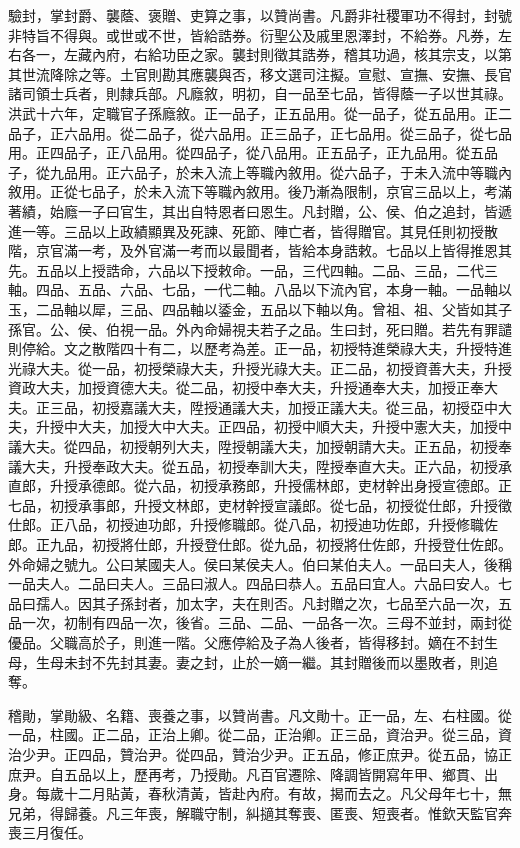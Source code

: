 驗封，掌封爵、襲蔭、褒贈、吏算之事，以贊尚書。凡爵非社稷軍功不得封，封號非特旨不得與。或世或不世，皆給誥券。衍聖公及戚里恩澤封，不給券。凡券，左右各一，左藏內府，右給功臣之家。襲封則徵其誥券，稽其功過，核其宗支，以第其世流降除之等。土官則勘其應襲與否，移文選司注擬。宣慰、宣撫、安撫、長官諸司領士兵者，則隸兵部。凡廕敘，明初，自一品至七品，皆得蔭一子以世其祿。洪武十六年，定職官子孫廕敘。正一品子，正五品用。從一品子，從五品用。正二品子，正六品用。從二品子，從六品用。正三品子，正七品用。從三品子，從七品用。正四品子，正八品用。從四品子，從八品用。正五品子，正九品用。從五品子，從九品用。正六品子，於未入流上等職內敘用。從六品子，于未入流中等職內敘用。正從七品子，於未入流下等職內敘用。後乃漸為限制，京官三品以上，考滿著績，始廕一子曰官生，其出自特恩者曰恩生。凡封贈，公、侯、伯之追封，皆遞進一等。三品以上政績顯異及死諫、死節、陣亡者，皆得贈官。其見任則初授散階，京官滿一考，及外官滿一考而以最聞者，皆給本身誥敕。七品以上皆得推恩其先。五品以上授誥命，六品以下授敕命。一品，三代四軸。二品、三品，二代三軸。四品、五品、六品、七品，一代二軸。八品以下流內官，本身一軸。一品軸以玉，二品軸以犀，三品、四品軸以鋈金，五品以下軸以角。曾祖、祖、父皆如其子孫官。公、侯、伯視一品。外內命婦視夫若子之品。生曰封，死曰贈。若先有罪譴則停給。文之散階四十有二，以歷考為差。正一品，初授特進榮祿大夫，升授特進光祿大夫。從一品，初授榮祿大夫，升授光祿大夫。正二品，初授資善大夫，升授資政大夫，加授資德大夫。從二品，初授中奉大夫，升授通奉大夫，加授正奉大夫。正三品，初授嘉議大夫，陞授通議大夫，加授正議大夫。從三品，初授亞中大夫，升授中大夫，加授大中大夫。正四品，初授中順大夫，升授中憲大夫，加授中議大夫。從四品，初授朝列大夫，陞授朝議大夫，加授朝請大夫。正五品，初授奉議大夫，升授奉政大夫。從五品，初授奉訓大夫，陞授奉直大夫。正六品，初授承直郎，升授承德郎。從六品，初授承務郎，升授儒林郎，吏材幹出身授宣德郎。正七品，初授承事郎，升授文林郎，吏材幹授宣議郎。從七品，初授從仕郎，升授徵仕郎。正八品，初授迪功郎，升授修職郎。從八品，初授迪功佐郎，升授修職佐郎。正九品，初授將仕郎，升授登仕郎。從九品，初授將仕佐郎，升授登仕佐郎。外命婦之號九。公曰某國夫人。侯曰某侯夫人。伯曰某伯夫人。一品曰夫人，後稱一品夫人。二品曰夫人。三品曰淑人。四品曰恭人。五品曰宜人。六品曰安人。七品曰孺人。因其子孫封者，加太字，夫在則否。凡封贈之次，七品至六品一次，五品一次，初制有四品一次，後省。三品、二品、一品各一次。三母不並封，兩封從優品。父職高於子，則進一階。父應停給及子為人後者，皆得移封。嫡在不封生母，生母未封不先封其妻。妻之封，止於一嫡一繼。其封贈後而以墨敗者，則追奪。

稽勛，掌勛級、名籍、喪養之事，以贊尚書。凡文勛十。正一品，左、右柱國。從一品，柱國。正二品，正治上卿。從二品，正治卿。正三品，資治尹。從三品，資治少尹。正四品，贊治尹。從四品，贊治少尹。正五品，修正庶尹。從五品，協正庶尹。自五品以上，歷再考，乃授勛。凡百官遷除、降調皆開寫年甲、鄉貫、出身。每歲十二月貼黃，春秋清黃，皆赴內府。有故，揭而去之。凡父母年七十，無兄弟，得歸養。凡三年喪，解職守制，糾擿其奪喪、匿喪、短喪者。惟欽天監官奔喪三月復任。

